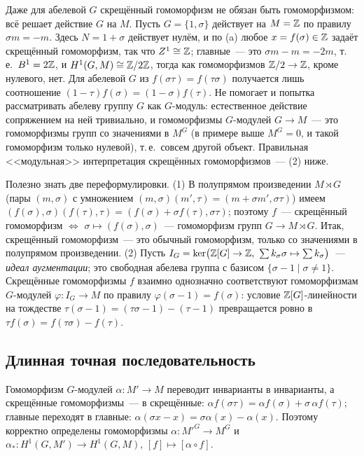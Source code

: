 \begin{remark}
Даже для абелевой $G$ скрещённый гомоморфизм не обязан быть гомоморфизмом: всё решает действие $G$ на $M$. Пусть
$G=\{1,\sigma\}$ действует на $M=\mathbb Z$ по правилу $\sigma m=-m$. Здесь $N=1+\sigma$ действует нулём, и по (a) любое
$x=f(\sigma)\in\mathbb Z$ задаёт скрещённый гомоморфизм, так что $Z^1\cong\mathbb Z$; главные~--- это $\sigma m-m=-2m$, т.\,е.\
$B^1=2\mathbb Z$, и $H^1(G,M)\cong\mathbb Z/2\mathbb Z$, тогда как гомоморфизмов $\mathbb Z/2\to\mathbb Z$, кроме нулевого, нет. Для абелевой $G$ из
$f(\sigma\tau)=f(\tau\sigma)$ получается лишь соотношение $(1-\tau)f(\sigma)=(1-\sigma)f(\tau)$. Не помогает и попытка
рассматривать абелеву группу $G$ как $G$-модуль: естественное действие сопряжением на ней тривиально, и гомоморфизмы
$G$-модулей $G\to M$~--- это гомоморфизмы групп со значениями в $M^G$ (в примере выше $M^G=0$, и такой гомоморфизм
только нулевой), т.\,е.\ совсем другой объект. Правильная <<модульная>>
интерпретация скрещённых гомоморфизмов~--- (2) ниже.

Полезно знать две переформулировки. (1) В полупрямом произведении $M\rtimes G$ (пары $(m,\sigma)$ с умножением
$(m,\sigma)(m',\tau)=(m+\sigma m',\sigma\tau)$) имеем $(f(\sigma),\sigma)(f(\tau),\tau)=(f(\sigma)+\sigma f(\tau),\sigma\tau)$;
поэтому $f$~--- скрещённый гомоморфизм $\iff$ $\sigma\mapsto(f(\sigma),\sigma)$~--- гомоморфизм групп $G\to M\rtimes G$.
Итак, скрещённый гомоморфизм~--- это обычный гомоморфизм, только со значениями в полупрямом произведении. (2) Пусть
$I_G=\ker\bigl(\mathbb Z[G]\to\mathbb Z,\ \sum k_\sigma\sigma\mapsto\sum k_\sigma\bigr)$~--- \emph{идеал аугментации}; это свободная
абелева группа с базисом $\{\sigma-1\mid\sigma\ne1\}$. Скрещённые гомоморфизмы $f$ взаимно однозначно соответствуют
гомоморфизмам $G$-модулей $\varphi\colon I_G\to M$ по правилу $\varphi(\sigma-1)=f(\sigma)$: условие $\mathbb Z[G]$-линейности
на тождестве $\tau(\sigma-1)=(\tau\sigma-1)-(\tau-1)$ превращается ровно в $\tau f(\sigma)=f(\tau\sigma)-f(\tau)$.
\end{remark}

\subsection*{Длинная точная последовательность}

Гомоморфизм $G$-модулей $\alpha\colon M'\to M$ переводит инварианты в инварианты, а скрещённые гомоморфизмы~--- в
скрещённые: $\alpha f(\sigma\tau)=\alpha f(\sigma)+\sigma\,\alpha f(\tau)$; главные переходят в главные:
$\alpha(\sigma x-x)=\sigma\alpha(x)-\alpha(x)$. Поэтому корректно определены гомоморфизмы $\alpha\colon M'^G\to M^G$ и
$\alpha_*\colon H^1(G,M')\to H^1(G,M)$, $[f]\mapsto[\alpha\circ f]$.


